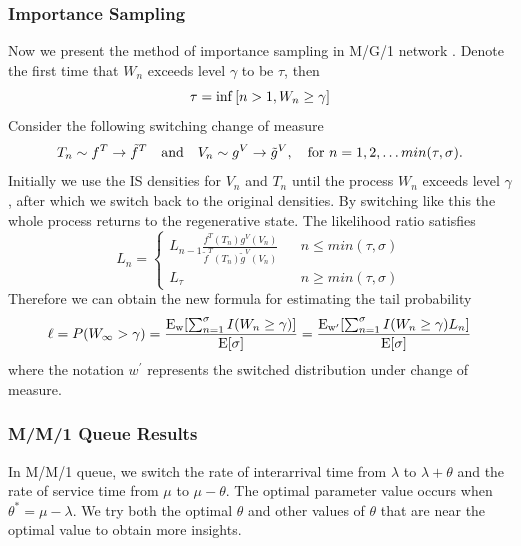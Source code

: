 \documentclass{article}
\begin{document}
\subsubsection{Importance Sampling}
Now we present the method of importance sampling in M/G/1 network \citep{rubinstein2004cross}.
Denote the first time that {$W_n$} exceeds level $\gamma$ to be $\tau$, then
\begin{equation}
	\tau = {\rm inf} \left[n>1, W_n \geq \gamma\right]
\end{equation}
Consider the following switching change of measure
\begin{equation}
	T_n \sim f^{T} \rightarrow \tilde{f}^{T}\quad {\rm and} \quad V_n \sim g^{V} \rightarrow \tilde{g}^{V}, \quad {\rm for\ } n=1,2,\dots min(\tau, \sigma).    
\end{equation}
Initially we use the IS densities for $V_n$ and $T_n$ until the process {$W_n$} exceeds level $\gamma$, after which we switch back to the original densities. By switching like this the whole process returns to the regenerative state.
The likelihood ratio satisfies
\begin{equation}
	L_n=\left\{
		\begin{array}{lcl}
		L_{n-1}\frac{f^T(T_n)g^V(V_n)}{\tilde{f}^T(T_n)\tilde{g}^V(V_n)}       &      & {n\leq min(\tau, \sigma)}\\
		L_{\tau}     &      & {n\geq min(\tau, \sigma)}
	\end{array} \right.
\end{equation}
 Therefore we can obtain the new formula for estimating the tail probability
 \begin{equation}
	 \ell = P(W_{\infty}>\gamma)=\frac{{\rm E_{w}}[\sum_{n=1}^{\sigma}I(W_n \geq \gamma)]}{{\rm E}[\sigma]}=\frac{{\rm E_{w^{\prime}}}[\sum_{n=1}^{\sigma}I(W_n \geq \gamma)L_n]}{{\rm E}[\sigma]}
 \end{equation}
where the notation $w^{\prime}$ represents the switched distribution under change of measure. 

\subsubsection{M/M/1 Queue Results}
In M/M/1 queue, we switch the rate of interarrival time from $\lambda$ to $\lambda + \theta$ and the rate of service time from $\mu$ to $\mu - \theta$. The optimal parameter value occurs when $\theta^{*} = \mu -\lambda$. We try both the optimal $\theta$ and other values of $\theta$ that are near the optimal value to obtain more insights.
\end{document}
